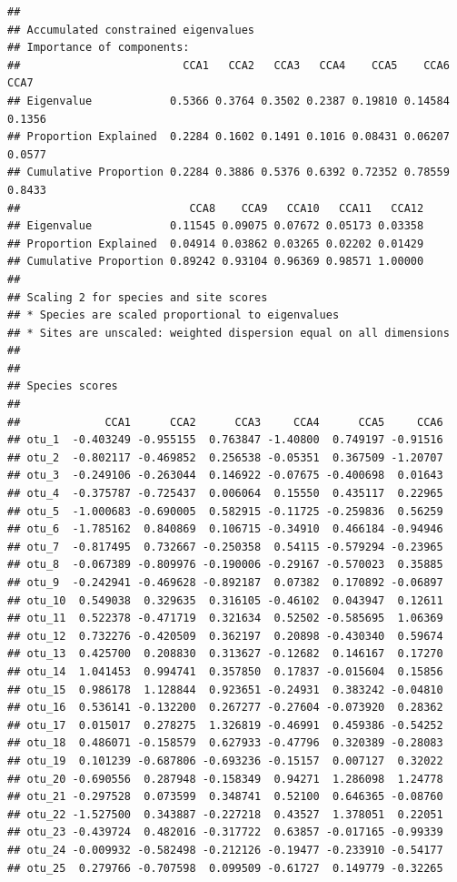\documentclass[
]{book}
\begin{document}
\begin{verbatim}
## 
## Accumulated constrained eigenvalues
## Importance of components:
##                         CCA1   CCA2   CCA3   CCA4    CCA5    CCA6   CCA7
## Eigenvalue            0.5366 0.3764 0.3502 0.2387 0.19810 0.14584 0.1356
## Proportion Explained  0.2284 0.1602 0.1491 0.1016 0.08431 0.06207 0.0577
## Cumulative Proportion 0.2284 0.3886 0.5376 0.6392 0.72352 0.78559 0.8433
##                          CCA8    CCA9   CCA10   CCA11   CCA12
## Eigenvalue            0.11545 0.09075 0.07672 0.05173 0.03358
## Proportion Explained  0.04914 0.03862 0.03265 0.02202 0.01429
## Cumulative Proportion 0.89242 0.93104 0.96369 0.98571 1.00000
## 
## Scaling 2 for species and site scores
## * Species are scaled proportional to eigenvalues
## * Sites are unscaled: weighted dispersion equal on all dimensions
## 
## 
## Species scores
## 
##             CCA1      CCA2      CCA3     CCA4      CCA5     CCA6
## otu_1  -0.403249 -0.955155  0.763847 -1.40800  0.749197 -0.91516
## otu_2  -0.802117 -0.469852  0.256538 -0.05351  0.367509 -1.20707
## otu_3  -0.249106 -0.263044  0.146922 -0.07675 -0.400698  0.01643
## otu_4  -0.375787 -0.725437  0.006064  0.15550  0.435117  0.22965
## otu_5  -1.000683 -0.690005  0.582915 -0.11725 -0.259836  0.56259
## otu_6  -1.785162  0.840869  0.106715 -0.34910  0.466184 -0.94946
## otu_7  -0.817495  0.732667 -0.250358  0.54115 -0.579294 -0.23965
## otu_8  -0.067389 -0.809976 -0.190006 -0.29167 -0.570023  0.35885
## otu_9  -0.242941 -0.469628 -0.892187  0.07382  0.170892 -0.06897
## otu_10  0.549038  0.329635  0.316105 -0.46102  0.043947  0.12611
## otu_11  0.522378 -0.471719  0.321634  0.52502 -0.585695  1.06369
## otu_12  0.732276 -0.420509  0.362197  0.20898 -0.430340  0.59674
## otu_13  0.425700  0.208830  0.313627 -0.12682  0.146167  0.17270
## otu_14  1.041453  0.994741  0.357850  0.17837 -0.015604  0.15856
## otu_15  0.986178  1.128844  0.923651 -0.24931  0.383242 -0.04810
## otu_16  0.536141 -0.132200  0.267277 -0.27604 -0.073920  0.28362
## otu_17  0.015017  0.278275  1.326819 -0.46991  0.459386 -0.54252
## otu_18  0.486071 -0.158579  0.627933 -0.47796  0.320389 -0.28083
## otu_19  0.101239 -0.687806 -0.693236 -0.15157  0.007127  0.32022
## otu_20 -0.690556  0.287948 -0.158349  0.94271  1.286098  1.24778
## otu_21 -0.297528  0.073599  0.348741  0.52100  0.646365 -0.08760
## otu_22 -1.527500  0.343887 -0.227218  0.43527  1.378051  0.22051
## otu_23 -0.439724  0.482016 -0.317722  0.63857 -0.017165 -0.99339
## otu_24 -0.009932 -0.582498 -0.212126 -0.19477 -0.233910 -0.54177
## otu_25  0.279766 -0.707598  0.099509 -0.61727  0.149779 -0.32265

\end{verbatim}
\end{document}
